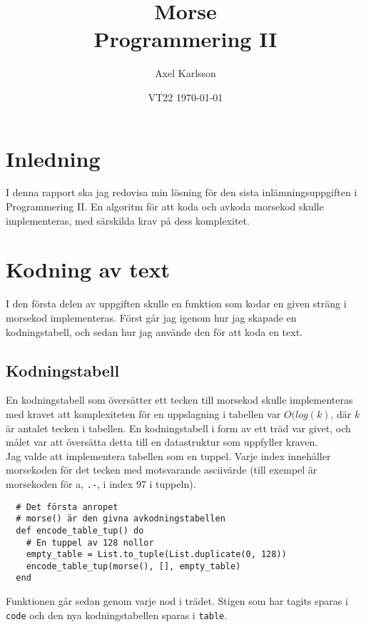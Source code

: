 \documentclass[a4paper,11pt]{article}
\begin{document}
\title{
  \textbf{Morse\\
  \small Programmering II}
}
\author{Axel Karlsson}
\date{VT22 \today}

\maketitle

\section*{Inledning}
I denna rapport ska jag redovisa min lösning för den sista inlämningsuppgiften i Programmering II. En algoritm för att koda och avkoda morsekod skulle implementeras, med särskilda krav på dess komplexitet.

\section*{Kodning av text}
I den första delen av uppgiften skulle en funktion som kodar en given sträng i morsekod implementeras. Först går jag igenom hur jag skapade en kodningstabell, och sedan hur jag använde den för att koda en text.

\subsection*{Kodningstabell}
En kodningstabell som översätter ett tecken till morsekod skulle implementeras med kravet att komplexiteten för en uppslagning i tabellen var \(O(log(k)\), där \(k\) är antalet tecken i tabellen. En kodningstabell i form av ett träd var givet, och målet var att översätta detta till en datastruktur som uppfyller kraven.\\
Jag valde att implementera tabellen som en tuppel. Varje index innehåller morsekoden för det tecken med motsvarande asciivärde (till exempel är morsekoden för a, {\tt .-}, i index 97 i tuppeln).

\begin{verbatim}
  # Det första anropet
  # morse() är den givna avkodningstabellen
  def encode_table_tup() do
    # En tuppel av 128 nollor
    empty_table = List.to_tuple(List.duplicate(0, 128)) 
    encode_table_tup(morse(), [], empty_table)
  end
\end{verbatim}

Funktionen går sedan genom varje nod i trädet. Stigen som har tagits sparas i \texttt{code} och den nya kodningstabellen sparas i \texttt{table}.
\end{document}
